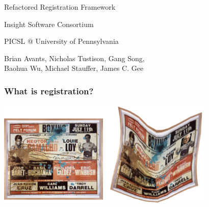 {
\color{white}
\begin{frame}[plain]
\fontsize{36pt}{36pt}\selectfont
\center
\begin{center}
Refactored Registration Framework
\end{center}

\fontsize{12pt}{12pt}\selectfont
\begin{center}
Insight Software Consortium
\end{center}
\newline
\begin{center}
 PICSL @ University of Pennsylvania 
\end{center}
\newline
\begin{center}
 Brian Avants, Nicholas Tustison, Gang Song, \\ 
Baohua Wu, Michael Stauffer, James C. Gee
\end{center}
\end{frame}
}

\begin{frame}
\frametitle{What is registration?}
\includegraphics[height=2in]{../Art/RegistrationBasquiatWarp.pdf}
\end{frame}

